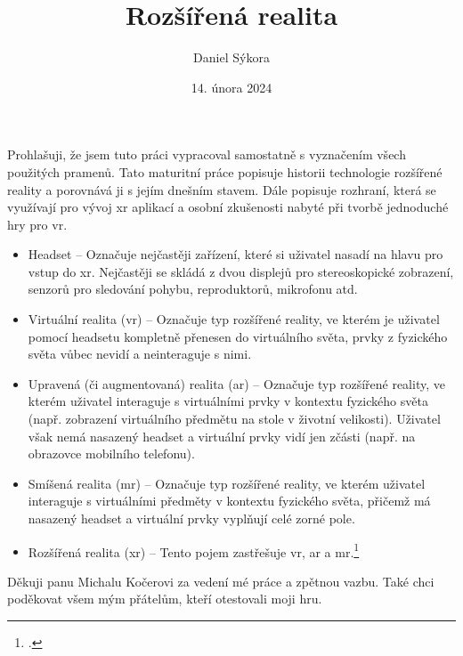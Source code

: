 \documentclass[12pt]{report}
\author{Daniel Sýkora}
\title{Rozšířená realita}
\date{14. února 2024}
\begin{document}
\mytitlepage
\prohlaseni
{
	Prohlašuji, že jsem tuto práci vypracoval samostatně s vyznačením všech použitých pramenů.
}
\abstrakt
{ %
	Tato maturitní práce popisuje historii technologie rozšířené reality a porovnává ji s jejím dnešním stavem. Dále popisuje rozhraní, která se využívají pro vývoj \gls{xr} aplikací a osobní zkušenosti nabyté při tvorbě jednoduché hry pro \gls{vr}.
}
{ %
	\begin{itemize}
		\item Headset -- Označuje nejčastěji zařízení, které si uživatel nasadí na hlavu pro vstup do \gls{xr}.
				Nejčastěji se skládá z dvou displejů pro stereoskopické zobrazení, senzorů pro sledování pohybu,
				reproduktorů, mikrofonu atd.

		\item Virtuální realita (\gls{vr}) -- Označuje typ rozšířené reality, ve kterém je uživatel pomocí headsetu
				kompletně přenesen do virtuálního světa, prvky z fyzického světa vůbec nevidí a neinteraguje s nimi.

		\item Upravená (či augmentovaná) realita (\gls{ar}) -- Označuje typ rozšířené reality, ve kterém uživatel interaguje
				s virtuálními prvky v kontextu fyzického světa (např. zobrazení virtuálního předmětu na stole v životní velikosti).
				Uživatel však nemá nasazený headset a virtuální prvky vidí jen zčásti (např. na obrazovce mobilního telefonu).

		\item Smíšená realita (\gls{mr}) -- Označuje typ rozšířené reality, ve kterém uživatel interaguje s virtuálními předměty
				v kontextu fyzického světa, přičemž má nasazený headset a virtuální prvky vyplňují celé zorné pole.

		\item Rozšířená realita (\gls{xr}) -- Tento pojem zastřešuje \gls{vr}, \gls{ar} a \gls{mr}.\footcite{xr_disambiguation}
	\end{itemize}
}
\podekovani
{
	Děkuji panu Michalu Kočerovi za vedení mé práce a zpětnou vazbu. Také chci poděkovat všem mým přátelům, kteří otestovali moji hru.
}

\tableofcontents
\newpage






\nocite{*}

\appendix
{}

\printbibliography
{}

\printglossary[title={Zkratky}]

\listoffigures
{}
\end{document}

